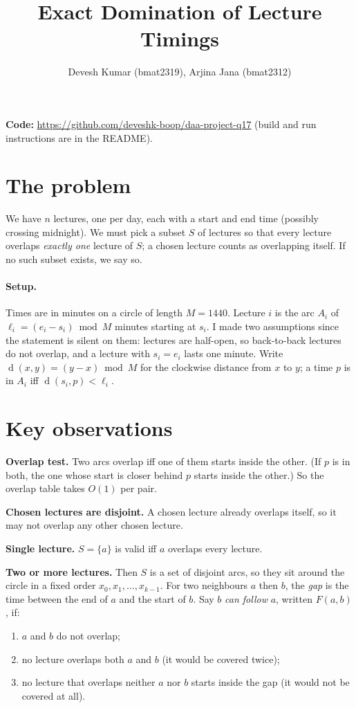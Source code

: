\documentclass[11pt,a4paper]{article}
\title{Exact Domination of Lecture Timings}
\author{Devesh Kumar (bmat2319), Arjina Jana (bmat2312)}
\date{}
\newcommand{\dist}{\operatorname{d}}
\begin{document}
\maketitle

\noindent\textbf{Code:} \url{https://github.com/deveshk-boop/daa-project-q17}
(build and run instructions are in the README).

\section{The problem}

We have $n$ lectures, one per day, each with a start and end time (possibly
crossing midnight). We must pick a subset $S$ of lectures so that every lecture
overlaps \emph{exactly one} lecture of $S$; a chosen lecture counts as
overlapping itself. If no such subset exists, we say so.

\paragraph{Setup.} Times are in minutes on a circle of length $M=1440$. Lecture
$i$ is the arc $A_i$ of $\ell_i=(e_i-s_i)\bmod M$ minutes starting at $s_i$. I
made two assumptions since the statement is silent on them: lectures are
half-open, so back-to-back lectures do not overlap, and a lecture with
$s_i=e_i$ lasts one minute. Write $\dist(x,y)=(y-x)\bmod M$ for the clockwise
distance from $x$ to $y$; a time $p$ is in $A_i$ iff $\dist(s_i,p)<\ell_i$.

\section{Key observations}

\textbf{Overlap test.} Two arcs overlap iff one of them starts inside the other.
(If $p$ is in both, the one whose start is closer behind $p$ starts inside the
other.) So the overlap table takes $O(1)$ per pair.

\textbf{Chosen lectures are disjoint.} A chosen lecture already overlaps itself,
so it may not overlap any other chosen lecture.

\textbf{Single lecture.} $S=\{a\}$ is valid iff $a$ overlaps every lecture.

\textbf{Two or more lectures.} Then $S$ is a set of disjoint arcs, so they sit
around the circle in a fixed order $x_0,x_1,\dots,x_{k-1}$. For two neighbours
$a$ then $b$, the \emph{gap} is the time between the end of $a$ and the start of
$b$. Say $b$ \emph{can follow} $a$, written $F(a,b)$, if:
\begin{enumerate}
  \item $a$ and $b$ do not overlap;
  \item no lecture overlaps both $a$ and $b$ (it would be covered twice);
  \item no lecture that overlaps neither $a$ nor $b$ starts inside the gap
  (it would not be covered at all).
\end{enumerate}
\end{document}
